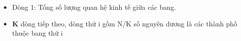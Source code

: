 \begin{itemize}
	\item Dòng 1: Tổng số lượng quan hệ kinh tế giữa các bang.
	\item \textbf{K }dòng tiếp theo, dòng thứ i gồm N/K số nguyên dương là các thành phố thuộc bang thứ i
\end{itemize}